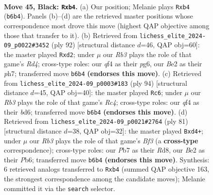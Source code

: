 \documentclass[11pt]{article}
\begin{document}
\clearpage

\begin{figure}[p]\centering
\begin{subfigure}{0.46\textwidth}\centering
\resizebox{\linewidth}{!}{%
\newchessgame
\chessboard[
  setfen={3k4/1p1n4/1r1p4/3R4/1P2PQ2/8/4b1PP/K7 b - - 3 45},
  showmover=false,
  pgfstyle=straightmove, color=movearrow, markmove={b6-b4}
]}
\caption{}
\end{subfigure}\hfill
\begin{subfigure}{0.46\textwidth}\centering
\resizebox{\linewidth}{!}{%
\newchessgame
\chessboard[
  setfen={3r3k/7p/2rP2p1/2P5/N2R4/1p6/3p2K1/8 w - - 0 47},
  showmover=false,
  pgfstyle=straightmove, color=movearrow, markmove={d4-d2}
]}
\caption{}
\end{subfigure}
\\[4pt]
\begin{subfigure}{0.46\textwidth}\centering
\resizebox{\linewidth}{!}{%
\newchessgame
\chessboard[
  setfen={3k4/8/3b4/1K1Np2p/2R1P1rP/2P5/8/8 w - - 6 48},
  showmover=false,
  pgfstyle=straightmove, color=movearrow, markmove={c4-c6}
]}
\caption{}
\end{subfigure}\hfill
\begin{subfigure}{0.46\textwidth}\centering
\resizebox{\linewidth}{!}{%
\newchessgame
\chessboard[
  setfen={3r2k1/8/1p3b2/1P1p4/3Pn1P1/1Q6/7P/2B3K1 b - - 3 41},
  showmover=false,
  pgfstyle=straightmove, color=movearrow, markmove={f6-d4}
]}
\caption{}
\end{subfigure}
\caption{\textbf{Move 45, Black: \texttt{Rxb4}.} (a) Our position; Melanie plays \texttt{Rxb4} (\texttt{b6b4}). Panels (b)--(d) are the retrieved master positions whose correspondence most drove this move (highest QAP objective among those that transfer to it). (b) Retrieved from \texttt{lichess\_elite\_2024-09\_p0022\#3452} (ply 92) [structural distance $d$=46, QAP obj=60]: the master played \texttt{Rxd2}; under $\mu$ our \emph{Rb3} plays the role of that game's \emph{Rd4}; cross-type roles: our \emph{q}f4 as their \emph{p}g6, our \emph{B}e2 as their \emph{p}h7; transferred move \texttt{b6b4} \textbf{(endorses this move)}. (c) Retrieved from \texttt{lichess\_elite\_2024-09\_p0003\#183} (ply 94) [structural distance $d$=45, QAP obj=40]: the master played \texttt{Rc6}; under $\mu$ our \emph{Rb3} plays the role of that game's \emph{Rc4}; cross-type roles: our \emph{q}f4 as their \emph{b}d6; transferred move \texttt{b6b4} \textbf{(endorses this move)}. (d) Retrieved from \texttt{lichess\_elite\_2024-09\_p0021\#2764} (ply 81) [structural distance $d$=38, QAP obj=32]: the master played \texttt{Bxd4+}; under $\mu$ our \emph{Rb3} plays the role of that game's \emph{Bf3} (a \textbf{cross-type} correspondence); cross-type roles: our \emph{P}b7 as their \emph{R}d8, our \emph{B}e2 as their \emph{P}b6; transferred move \texttt{b6b4} \textbf{(endorses this move)}. Synthesis: 6 retrieved analogs transferred to \texttt{Rxb4} (summed QAP objective 163, the strongest correspondence among the candidate moves); Melanie committed it via the \texttt{search} selector.}
\label{fig:thought-m89}
\end{figure}
\end{document}
